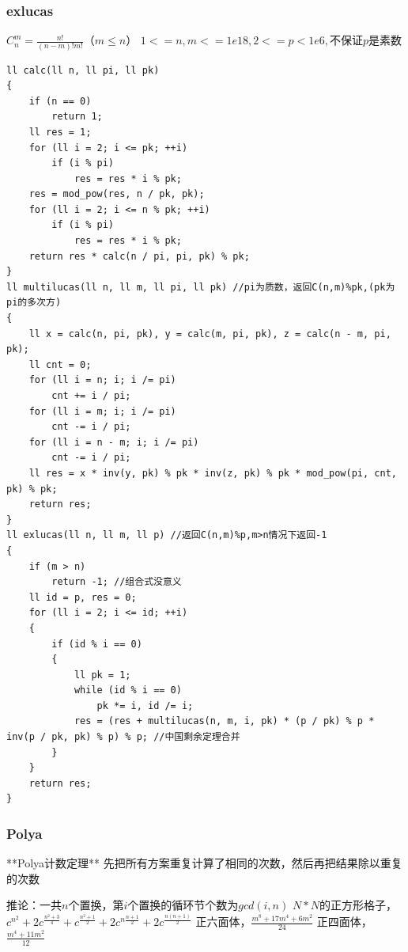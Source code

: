 \documentclass[twoside]{article}
\begin{document}
\subsubsection{exlucas}
$C_{n}^{m} = \frac{n!}{(n-m)!m!}（m \leq n）$
$1 <= n,m <= 1e18, 2<=p<1e6, 不保证p是素数$
\begin{lstlisting}
ll calc(ll n, ll pi, ll pk)
{
    if (n == 0)
        return 1;
    ll res = 1;
    for (ll i = 2; i <= pk; ++i)
        if (i % pi)
            res = res * i % pk;
    res = mod_pow(res, n / pk, pk);
    for (ll i = 2; i <= n % pk; ++i)
        if (i % pi)
            res = res * i % pk;
    return res * calc(n / pi, pi, pk) % pk;
}
ll multilucas(ll n, ll m, ll pi, ll pk) //pi为质数，返回C(n,m)%pk,(pk为pi的多次方)
{
    ll x = calc(n, pi, pk), y = calc(m, pi, pk), z = calc(n - m, pi, pk);
    ll cnt = 0;
    for (ll i = n; i; i /= pi)
        cnt += i / pi;
    for (ll i = m; i; i /= pi)
        cnt -= i / pi;
    for (ll i = n - m; i; i /= pi)
        cnt -= i / pi;
    ll res = x * inv(y, pk) % pk * inv(z, pk) % pk * mod_pow(pi, cnt, pk) % pk;
    return res;
}
ll exlucas(ll n, ll m, ll p) //返回C(n,m)%p,m>n情况下返回-1
{
    if (m > n)
        return -1; //组合式没意义
    ll id = p, res = 0;
    for (ll i = 2; i <= id; ++i)
    {
        if (id % i == 0)
        {
            ll pk = 1;
            while (id % i == 0)
                pk *= i, id /= i;
            res = (res + multilucas(n, m, i, pk) * (p / pk) % p * inv(p / pk, pk) % p) % p; //中国剩余定理合并
        }
    }
    return res;
}
\end{lstlisting}
\subsubsection{Polya}
**Polya计数定理** 先把所有方案重复计算了相同的次数，然后再把结果除以重复的次数

推论：一共$n$个置换，第$i$个置换的循环节个数为$gcd(i,n)$
$N*N$的正方形格子，$c^{n^2}+2c^{\frac{n^2+3}{4}}+c^{\frac{n^2+1}{2}}+2c^{n\frac{n+1}{2}}+2c^{\frac{n(n+1)}{2}}$
正六面体，$\frac{m^8+17m^4+6m^2}{24}$
正四面体，$\frac{m^4+11m^2}{12}$
\end{document}
